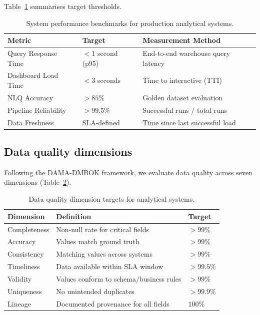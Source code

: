 \documentclass[preprint,12pt,authoryear]{elsarticle}
\theoremstyle{definition}
\begin{document}
Table~\ref{tab:performance} summarises target thresholds.

\begin{table}[ht]
\centering
\caption{System performance benchmarks for production analytical systems.}
\label{tab:performance}
\begin{tabular}{lll}
\toprule
\textbf{Metric} & \textbf{Target} & \textbf{Measurement Method} \\
\midrule
Query Response Time     & $<1$ second (p95) & End-to-end warehouse query latency \\
Dashboard Load Time     & $<3$ seconds      & Time to interactive (TTI) \\
NLQ Accuracy            & $>85\%$           & Golden dataset evaluation \\
Pipeline Reliability    & $>99.5\%$         & Successful runs / total runs \\
Data Freshness          & SLA-defined       & Time since last successful load \\
\bottomrule
\end{tabular}
\end{table}

\subsection{Data quality dimensions}

Following the DAMA-DMBOK framework, we evaluate data quality across seven dimensions (Table~\ref{tab:data-quality}).

\begin{table}[ht]
\centering
\caption{Data quality dimension targets for analytical systems.}
\label{tab:data-quality}
\begin{tabular}{lll}
\toprule
\textbf{Dimension} & \textbf{Definition} & \textbf{Target} \\
\midrule
Completeness & Non-null rate for critical fields     & $>99\%$ \\
Accuracy     & Values match ground truth              & $>99\%$ \\
Consistency  & Matching values across systems         & $>99\%$ \\
Timeliness   & Data available within SLA window       & $>99.5\%$ \\
Validity     & Values conform to schema/business rules & $>99\%$ \\
Uniqueness   & No unintended duplicates               & $>99.9\%$ \\
Lineage      & Documented provenance for all fields   & $100\%$ \\
\bottomrule
\end{tabular}
\end{table}
\end{document}

